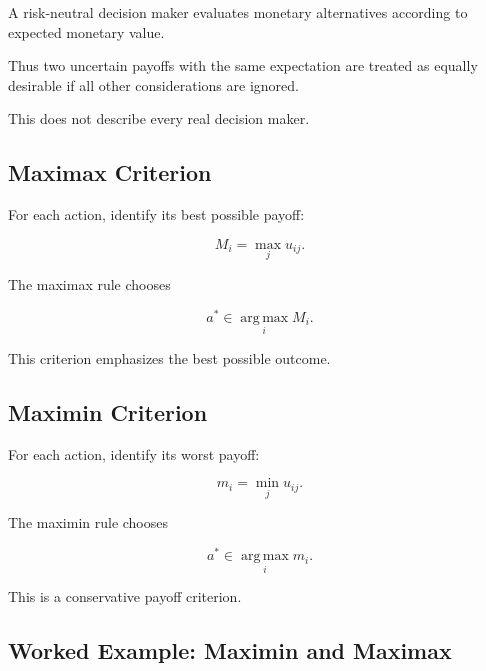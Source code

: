 A risk-neutral decision maker evaluates monetary alternatives according to
expected monetary value.

Thus two uncertain payoffs with the same expectation are treated as
equally desirable if all other considerations are ignored.

This does not describe every real decision maker.

\subsection{Maximax Criterion}
\label{subsec:maximax-criterion}

For each action, identify its best possible payoff:

\[
\boxed{
M_i
=
\max_j
u_{ij}.
}
\]

The maximax rule chooses

\[
\boxed{
a^*
\in
\operatorname*{arg\,max}_i
M_i.
}
\]

This criterion emphasizes the best possible outcome.

\subsection{Maximin Criterion}
\label{subsec:maximin-criterion}

For each action, identify its worst payoff:

\[
\boxed{
m_i
=
\min_j
u_{ij}.
}
\]

The maximin rule chooses

\[
\boxed{
a^*
\in
\operatorname*{arg\,max}_i
m_i.
}
\]

This is a conservative payoff criterion.

\subsection{Worked Example: Maximin and Maximax}
\label{subsec:worked-maximin-maximax}

